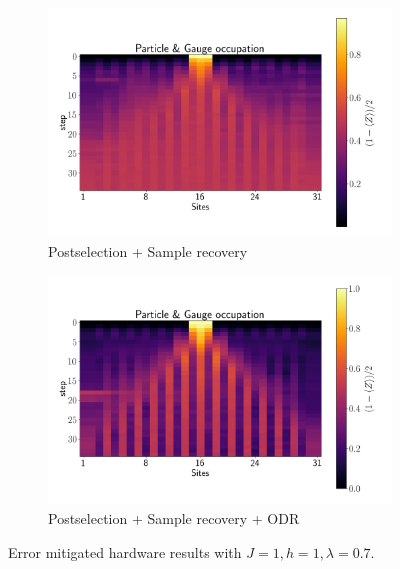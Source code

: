 \documentclass[a4paper]{article}
\begin{document}
\begin{figure}
    \centering
    \begin{subfigure}[c]{0.49\textwidth}
        \centering
        \includegraphics[width=\textwidth]{Results figs/hardware_postselection_z2pairquench_maxt_8_steps_35_L_16_J_1.0000_h_0.0500_lamb_0.7000_g_5_pp_7_pl_1_dc_XY4_xbasis_False.png}
        \caption{Postselection + Sample recovery}
    \end{subfigure}
    \begin{subfigure}[c]{0.49\textwidth}
        \includegraphics[width=\textwidth]{Results figs/odr_hardware_postselection_z2pairquench_maxt_8_steps_35_L_16_J_1.0000_h_0.0500_lamb_0.7000_g_10_pp_7_pl_1_dc_XY4_xbasis_False.png}
        \caption{Postselection + Sample recovery + ODR}
    \end{subfigure}
    \caption{Error mitigated hardware results with $J = 1, h = 1, \lambda = 0.7$.}
    \label{fig:postselection_results}
\end{figure}
\end{document}
